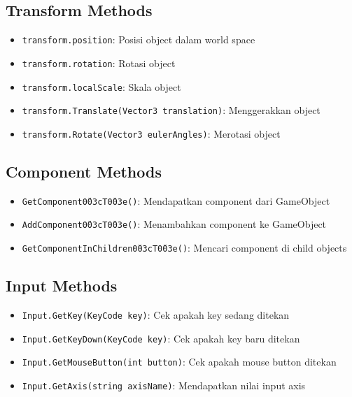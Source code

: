 \subsection*{Transform Methods}
\begin{itemize}
  \item \texttt{transform.position}: Posisi object dalam world space
  \item \texttt{transform.rotation}: Rotasi object
  \item \texttt{transform.localScale}: Skala object
  \item \texttt{transform.Translate(Vector3 translation)}: Menggerakkan object
  \item \texttt{transform.Rotate(Vector3 eulerAngles)}: Merotasi object
\end{itemize}

\subsection*{Component Methods}
\begin{itemize}
  \item \texttt{GetComponent\u003cT\u003e()}: Mendapatkan component dari GameObject
  \item \texttt{AddComponent\u003cT\u003e()}: Menambahkan component ke GameObject
  \item \texttt{GetComponentInChildren\u003cT\u003e()}: Mencari component di child objects
\end{itemize}

\subsection*{Input Methods}
\begin{itemize}
  \item \texttt{Input.GetKey(KeyCode key)}: Cek apakah key sedang ditekan
  \item \texttt{Input.GetKeyDown(KeyCode key)}: Cek apakah key baru ditekan
  \item \texttt{Input.GetMouseButton(int button)}: Cek apakah mouse button ditekan
  \item \texttt{Input.GetAxis(string axisName)}: Mendapatkan nilai input axis
\end{itemize}
